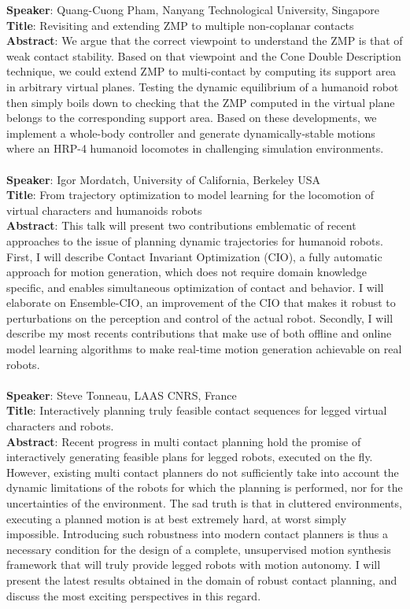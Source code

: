 \documentclass[conference]{IEEEtran}
\begin{document}
\textbf{Speaker}: Quang-Cuong Pham, Nanyang Technological University, Singapore \\
\textbf{Title}:  Revisiting and extending ZMP to multiple non-coplanar contacts \\
\textbf{Abstract}: We argue that the correct viewpoint to understand the ZMP is that of weak contact stability. Based on that viewpoint and the Cone Double Description technique, we could extend ZMP to multi-contact by computing its support area in arbitrary virtual planes. Testing the dynamic equilibrium of a humanoid robot then simply boils down to checking that the ZMP computed in the virtual plane belongs to the corresponding support area. Based on these developments, we implement a whole-body controller and generate dynamically-stable motions where an HRP-4 humanoid locomotes in challenging simulation environments.   \\ \\
\textbf{Speaker}: Igor Mordatch, University of California, Berkeley USA \\
\textbf{Title}: From trajectory optimization to model learning for the locomotion of virtual characters and humanoids robots \\
\textbf{Abstract}: This talk will present two contributions emblematic of recent approaches to the issue of planning dynamic trajectories for humanoid robots.
First, I will describe Contact Invariant Optimization (CIO), a fully automatic approach for motion generation, which does not require domain knowledge speciﬁc,
and enables simultaneous optimization of contact and behavior. I will elaborate on Ensemble-CIO, an improvement of the CIO that makes it robust to  perturbations on the perception
and control of the actual robot. Secondly, I will describe my most recents contributions that make use of both offline and online model learning algorithms to make real-time motion generation
achievable on real robots.  \\ \\
\textbf{Speaker}: Steve Tonneau, LAAS CNRS, France \\
\textbf{Title}: Interactively planning truly feasible contact sequences for legged virtual characters and robots.\\
\textbf{Abstract}: Recent progress in multi contact planning hold the promise of interactively generating feasible plans for legged robots, executed on the fly.
However, existing multi contact planners do not sufficiently take into account the dynamic limitations of the robots for which the planning is performed, nor for the uncertainties of the environment. The sad truth is that in cluttered environments, executing a planned motion is at best extremely hard, at worst simply impossible. Introducing such
robustness into modern contact planners is thus a necessary condition for the design of a complete, unsupervised
motion synthesis framework that will truly provide legged robots with motion autonomy. I will
present the latest results obtained in the domain of robust contact planning, and discuss the most exciting perspectives
in this regard.\\ \\
\end{document}
